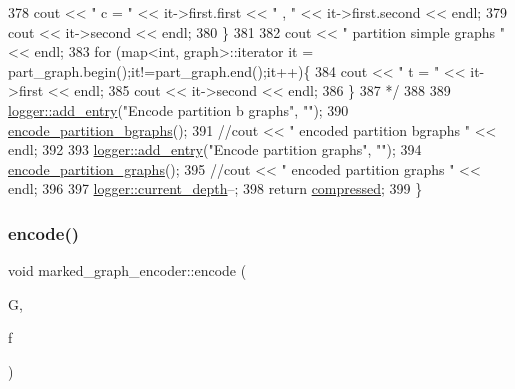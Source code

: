 \begin{DoxyCode}
378 \textcolor{comment}{    cout << " c = " << it->first.first << " , " << it->first.second << endl;}
379 \textcolor{comment}{    cout << it->second << endl;}
380 \textcolor{comment}{  \}}
381 \textcolor{comment}{}
382 \textcolor{comment}{  cout << " partition simple graphs " << endl;}
383 \textcolor{comment}{  for (map<int, graph>::iterator it = part\_graph.begin();it!=part\_graph.end();it++)\{}
384 \textcolor{comment}{    cout << " t = " << it->first << endl;}
385 \textcolor{comment}{    cout << it->second << endl;}
386 \textcolor{comment}{  \}}
387 \textcolor{comment}{  */}
388 
389   \hyperlink{classlogger_a710163deb17bc81f70d53d285b8ac9ac}{logger::add\_entry}(\textcolor{stringliteral}{"Encode partition b graphs"}, \textcolor{stringliteral}{""});
390   \hyperlink{classmarked__graph__encoder_aa113c4870e3221faa332b2151b63d9e6}{encode\_partition\_bgraphs}();
391   \textcolor{comment}{//cout << " encoded partition bgraphs " << endl;}
392 
393   \hyperlink{classlogger_a710163deb17bc81f70d53d285b8ac9ac}{logger::add\_entry}(\textcolor{stringliteral}{"Encode partition graphs"}, \textcolor{stringliteral}{""});
394   \hyperlink{classmarked__graph__encoder_a654463d4b256b84225f5944b5e361ebf}{encode\_partition\_graphs}();
395   \textcolor{comment}{//cout << " encoded partition graphs " << endl;}
396   
397   \hyperlink{classlogger_a9d29b49bd318a719a8e85b59eac54fe0}{logger::current\_depth}--;
398   \textcolor{keywordflow}{return} \hyperlink{classmarked__graph__encoder_ac2ded200860fdd2321f86dd76b28bcb3}{compressed};
399 \}
\end{DoxyCode}
\mbox{\label{classmarked__graph__encoder_a75b32c3c4557bec3322df60ac476fdc9}} 
\subsubsection{\texorpdfstring{encode()}{encode()}\hspace{0.1cm}{\footnotesize\ttfamily [2/2]}}
{\footnotesize\ttfamily void marked\+\_\+graph\+\_\+encoder\+::encode (\begin{DoxyParamCaption}\item[{const \hyperlink{classmarked__graph}{marked\+\_\+graph} \&}]{G,  }\item[{F\+I\+LE $\ast$}]{f }\end{DoxyParamCaption})}



